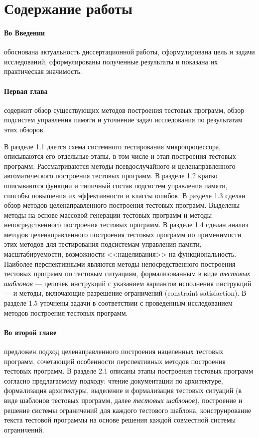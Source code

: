 \documentclass[14pt,autoref,href
,facsimile
]{disser}
\begin{document}
%
%


\section*{Содержание работы}

\paragraph{Во Введении} обоснована актуальность диссертационной работы,
сформулирована цель и задачи исследований, сформулированы полученные результаты и показана их
практическая значимость.

%
%


\paragraph{Первая глава} содержит обзор существующих методов построения тестовых программ, обзор подсистем управления памяти и уточнение задач исследования по результатам этих обзоров.

В разделе 1.1 дается схема системного тестирования микропроцессора, описываются его отдельные этапы, в том числе и этап построения тестовых программ. Рассматриваются методы псевдослучайного и целенаправленного автоматического построения тестовых программ. В разделе 1.2 кратко описываются функции и типичный состав подсистем управления памяти, способы повышения их эффективности и классы ошибок. В разделе 1.3 сделан обзор методов целенаправленного построения тестовых программ. Выделены методы на основе массовой генерации тестовых программ и методы непосредственного построения тестовых программ. В разделе 1.4 сделан анализ методов целенаправленного построения тестовых программ по применимости этих методов для тестирования подсистемам управления памяти, масштабируемости, возможности <<нацеливания>> на функциональность. Наиболее перспективными являются методы непосредственного построения тестовых программ по тестовым ситуациям, формализованным в виде \emph{тестовых шаблонов} --- цепочек инструкций с указанием вариантов исполнения инструкций --- и методы, включающие разрешение ограничений (constraint satisfaction). В разделе 1.5 уточнены задачи в соответствии с проведенным исследованием методов построения тестовых программ.

\paragraph{Во второй главе} предложен подход целенаправленного построения нацеленных тестовых программ, сочетающий особенности перспективных методов построения тестовых программ. В разделе 2.1 описаны этапы построения тестовых программ согласно предлагаемому подходу: чтение документации по архитектуре, формализация архитектуры, выделение и формализация тестовых ситуаций (в виде шаблонов тестовых программ, далее \emph{тестовых шаблонов}), построение и решение системы ограничений для каждого тестового шаблона, конструирование текста тестовой программы на основе решения каждой совместной системы ограничений.
\end{document}
